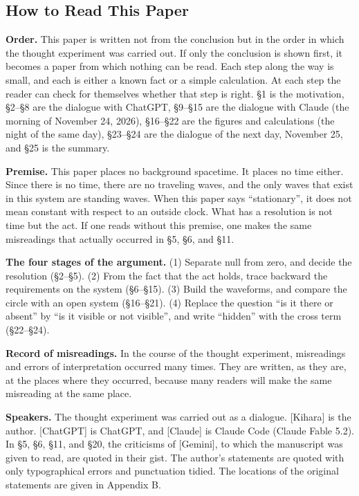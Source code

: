 \documentclass[
  a4paper,
]{article}
\begin{document}
\subsection{How to Read This Paper}\label{how-to-read-this-paper}

\textbf{Order.} This paper is written not from the conclusion but in the
order in which the thought experiment was carried out. If only the
conclusion is shown first, it becomes a paper from which nothing can be
read. Each step along the way is small, and each is either a known fact
or a simple calculation. At each step the reader can check for
themselves whether that step is right. §1 is the motivation, §2--§8 are
the dialogue with ChatGPT, §9--§15 are the dialogue with Claude (the
morning of November 24, 2026), §16--§22 are the figures and calculations
(the night of the same day), §23--§24 are the dialogue of the next day,
November 25, and §25 is the summary.

\textbf{Premise.} This paper places no background spacetime. It places
no time either. Since there is no time, there are no traveling waves,
and the only waves that exist in this system are standing waves. When
this paper says ``stationary'', it does not mean constant with respect
to an outside clock. What has a resolution is not time but the act. If
one reads without this premise, one makes the same misreadings that
actually occurred in §5, §6, and §11.

\textbf{The four stages of the argument.} (1) Separate null from zero,
and decide the resolution (§2--§5). (2) From the fact that the act
holds, trace backward the requirements on the system (§6--§15). (3)
Build the waveforms, and compare the circle with an open system
(§16--§21). (4) Replace the question ``is it there or absent'' by ``is
it visible or not visible'', and write ``hidden'' with the cross term
(§22--§24).

\textbf{Record of misreadings.} In the course of the thought experiment,
misreadings and errors of interpretation occurred many times. They are
written, as they are, at the places where they occurred, because many
readers will make the same misreading at the same place.

\textbf{Speakers.} The thought experiment was carried out as a dialogue.
{[}Kihara{]} is the author. {[}ChatGPT{]} is ChatGPT, and {[}Claude{]}
is Claude Code (Claude Fable 5.2). In §5, §6, §11, and §20, the
criticisms of {[}Gemini{]}, to which the manuscript was given to read,
are quoted in their gist. The author's statements are quoted with only
typographical errors and punctuation tidied. The locations of the
original statements are given in Appendix B.
\end{document}
